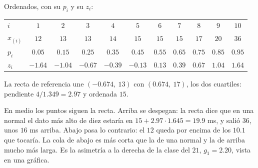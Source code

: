\documentclass[11pt,letterpaper]{article}
\begin{document}
\begin{ejemplo}
    Ordenados, con su $p_i$ y su $z_i$:
    \begin{center}
    \small
    \setlength{\tabcolsep}{4pt}
    \begin{tabular}{lcccccccccc}
        \toprule
        $i$ & $1$ & $2$ & $3$ & $4$ & $5$ & $6$ & $7$ & $8$ & $9$
            & $10$ \\
        $x_{(i)}$ & $12$ & $13$ & $13$ & $14$ & $15$ & $15$ & $15$
                  & $17$ & $20$ & $36$ \\
        $p_i$ & $0.05$ & $0.15$ & $0.25$ & $0.35$ & $0.45$ & $0.55$
              & $0.65$ & $0.75$ & $0.85$ & $0.95$ \\
        $z_i$ & $-1.64$ & $-1.04$ & $-0.67$ & $-0.39$ & $-0.13$
              & $0.13$ & $0.39$ & $0.67$ & $1.04$ & $1.64$ \\
        \bottomrule
    \end{tabular}
    \end{center}
    La recta de referencia une $(-0.674,\ 13)$ con $(0.674,\ 17)$, los
    dos cuartiles: pendiente $4 / 1.349 = 2.97$ y ordenada $15$.
    \begin{center}
    \end{center}
    En medio los puntos siguen la recta. Arriba se despegan: la recta
    dice que en una normal el dato más alto de diez estaría en
    $15 + 2.97 \cdot 1.645 = 19.9$ ms, y salió $36$, unos $16$ ms
    arriba. Abajo pasa lo contrario: el $12$ queda por encima de los
    $10.1$ que tocaría. La cola de abajo es más corta que la de una
    normal y la de arriba mucho más larga. Es la asimetría a la derecha
    de la clase del $21$, $g_1 = 2.20$, vista en una gráfica.
\end{ejemplo}
\end{document}

